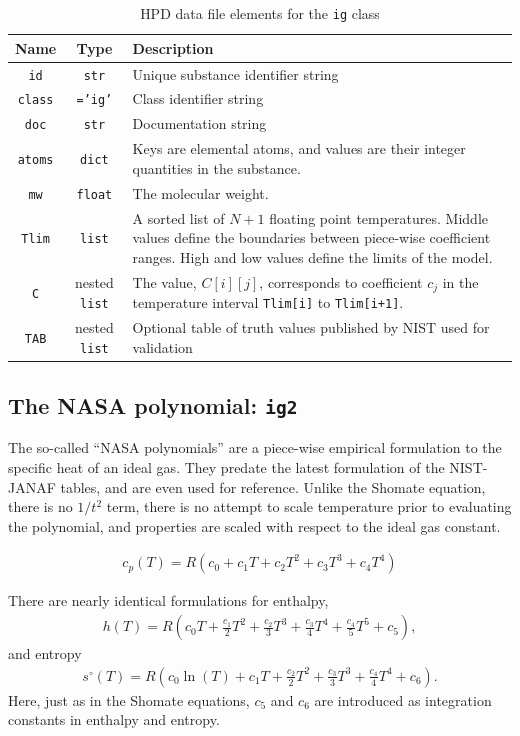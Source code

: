 \begin{table}
\centering
\caption{HPD data file elements for the \texttt{ig} class}\label{tab:class:ig}
\begin{tabular}{|ccp{2.5in}|}
\hline
Name & Type & Description\\
\hline
\texttt{id} & \texttt{str} & Unique substance identifier string\\
\texttt{class} & \texttt{='ig'} & Class identifier string\\
\texttt{doc} & \texttt{str} & Documentation string\\
\hline
\texttt{atoms} & \texttt{dict} & Keys are elemental atoms, and values are their integer quantities in the substance.\\
\texttt{mw} & \texttt{float} & The molecular weight.\\
\texttt{Tlim} & \texttt{list} & A sorted list of $N+1$ floating point temperatures.  Middle values define the boundaries between piece-wise coefficient ranges.  High and low values define the limits of the model.\\
\texttt{C} & nested \texttt{list} & The value, $C[i][j]$, corresponds to coefficient $c_j$ in the temperature interval \texttt{Tlim[i]} to \texttt{Tlim[i+1]}.\\
\hline
\texttt{TAB} & nested \texttt{list} & Optional table of truth values published by NIST used for validation\\
\hline
\end{tabular}
\end{table}


\subsection{The NASA polynomial: \texttt{ig2}}\label{sec:ig:ig2}

The so-called ``NASA polynomials'' are a piece-wise empirical formulation to the specific heat of an ideal gas.  They predate the latest formulation of the NIST-JANAF tables, and are even used for reference.  Unlike the Shomate equation, there is no $1/t^2$ term, there is no attempt to scale temperature prior to evaluating the polynomial, and properties are scaled with respect to the ideal gas constant.

\begin{align}
c_p(T) = R\left(c_0 + c_1 T + c_2 T^2 + c_3 T^3 + c_4 T^4\right)
\end{align}

There are nearly identical formulations for enthalpy,
\begin{align}
h(T) = R \left(c_0 T + \frac{c_1}{2} T^2 + \frac{c_2}{3} T^3 + \frac{c_3}{4} T^4 + \frac{c_4}{5}T^5 + c_5 \right),
\end{align}
and entropy
\begin{align}
s^\circ(T) = R \left(c_0 \ln(T) + c_1 T + \frac{c_2}{2} T^2 + \frac{c_3}{3} T^3 + \frac{c_4}{4} T^4 + c_6\right).
\end{align}
Here, just as in the Shomate equations, $c_5$ and $c_6$ are introduced as integration constants in enthalpy and entropy.

